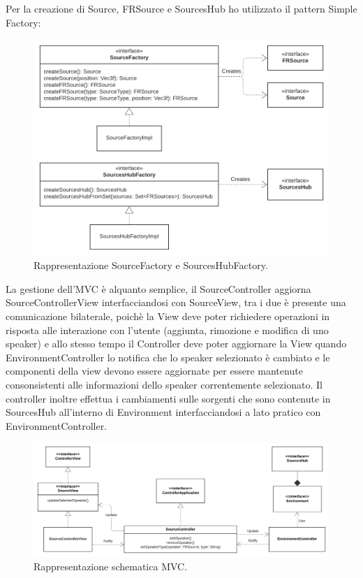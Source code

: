 \documentclass[a4paper,12pt]{report}
\begin{document}
Per la creazione di Source, FRSource e SourcesHub ho utilizzato il  pattern Simple Factory:
%
\begin{figure}[H]
\centering{}
\includegraphics[width=\textwidth]{img/source/Factory.png}
\caption{Rappresentazione SourceFactory e SourcesHubFactory.}
\label{img:factory}
\end{figure}

La gestione dell'MVC è alquanto semplice, il SourceController aggiorna SourceControllerView interfacciandosi con SourceView, tra i due è presente una comunicazione bilaterale, poichè la View deve poter richiedere operazioni in risposta alle interazione con l'utente (aggiunta, rimozione e modifica di uno speaker) e allo stesso tempo il Controller deve poter aggiornare la View quando EnvironmentController lo notifica che lo speaker selezionato è cambiato e le componenti della view devono essere aggiornate per essere mantenute consonsistenti alle informazioni dello speaker correntemente selezionato.
Il controller inoltre effettua i cambiamenti sulle sorgenti che sono contenute in SourcesHub all'interno di Environment interfacciandosi a lato pratico con EnvironmentController.
%
\begin{figure}[H]
\centering{}
\includegraphics[width=\textwidth]{img/source/SourcesMVC.png}
\caption{Rappresentazione schematica MVC.}
\label{img:sourcesMVC}
\end{figure}
\end{document}
